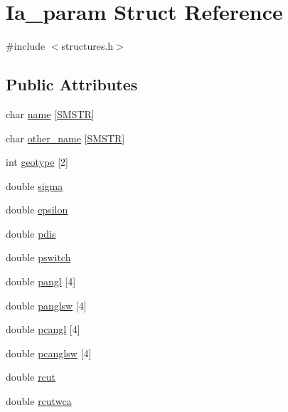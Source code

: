 \hypertarget{struct_ia__param}{\section{Ia\+\_\+param Struct Reference}
\label{struct_ia__param}
}


{\ttfamily \#include $<$structures.\+h$>$}

\subsection*{Public Attributes}
\begin{DoxyCompactItemize}
\item 
char \hyperlink{struct_ia__param_a93db89588de0ca8555f7b312424161db}{name} \mbox{[}\hyperlink{macros_8h_aa7445b8b5da5275d3f14a3ac4416ca77}{S\+M\+S\+T\+R}\mbox{]}
\item 
char \hyperlink{struct_ia__param_afd6e54f0e156fdbcb2c3a7a21867c147}{other\+\_\+name} \mbox{[}\hyperlink{macros_8h_aa7445b8b5da5275d3f14a3ac4416ca77}{S\+M\+S\+T\+R}\mbox{]}
\item 
int \hyperlink{struct_ia__param_a3ff31140f1898b4792a39745eec89a2e}{geotype} \mbox{[}2\mbox{]}
\item 
double \hyperlink{struct_ia__param_aafb540d04d54bd58140378a84f94b81d}{sigma}
\item 
double \hyperlink{struct_ia__param_afc12bb1527874046f8d8a5769493b142}{epsilon}
\item 
double \hyperlink{struct_ia__param_a63ddf4536d542af40513d4c057fc63d8}{pdis}
\item 
double \hyperlink{struct_ia__param_a472503a5c3cb1e523fab0fba256b6908}{pswitch}
\item 
double \hyperlink{struct_ia__param_a8b6be7ac5589120595dbbecb0573b4a4}{pangl} \mbox{[}4\mbox{]}
\item 
double \hyperlink{struct_ia__param_a4135a2a675b1087915a103c9a528c307}{panglsw} \mbox{[}4\mbox{]}
\item 
double \hyperlink{struct_ia__param_a9b41eeb7c326fd32a095499d42a134fb}{pcangl} \mbox{[}4\mbox{]}
\item 
double \hyperlink{struct_ia__param_ab0fef38181fd2df68e838ba1abc0e0ef}{pcanglsw} \mbox{[}4\mbox{]}
\item 
double \hyperlink{struct_ia__param_abd72fc915c8c5d7c1786c765e808bcd4}{rcut}
\item 
double \hyperlink{struct_ia__param_a9a7d011fda48b10b3f6c005eddb433e4}{rcutwca}
\item 

\end{DoxyCompactItemize}
